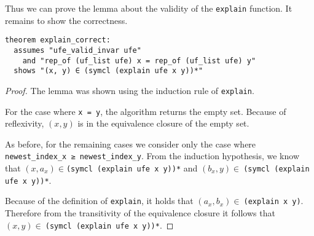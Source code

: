 Thus we can prove the lemma about the validity of the \lstinline|explain| function.
It remains to show the correctness.

\begin{lstlisting}
theorem explain_correct:
  assumes "ufe_valid_invar ufe"
    and "rep_of (uf_list ufe) x = rep_of (uf_list ufe) y"
  shows "(x, y) ∈ (symcl (explain ufe x y))*"
\end{lstlisting}

\begin{proof}
The lemma was shown using the induction rule of \lstinline|explain|.

For the case where \lstinline|x = y|, the algorithm returns the empty set. Because of reflexivity, $(x, y)$ is in the equivalence closure of the empty set.

As before, for the remaining cases we consider only the case where \lstinline|newest_index_x ≥ newest_index_y|.
From the induction hypothesis, we know that $(x, a_x) \in$\lstinline{(symcl (explain ufe x y))*} and $(b_x, y) \in\:$\lstinline{(symcl (explain ufe x y))*}.

Because of the definition of \lstinline|explain|, it holds that $(a_x, b_x) \in\:$\lstinline{(explain x y)}. Therefore from the transitivity of the equivalence closure it follows that $(x, y) \in\:$\lstinline{(symcl (explain ufe x y))*}.
\end{proof}
